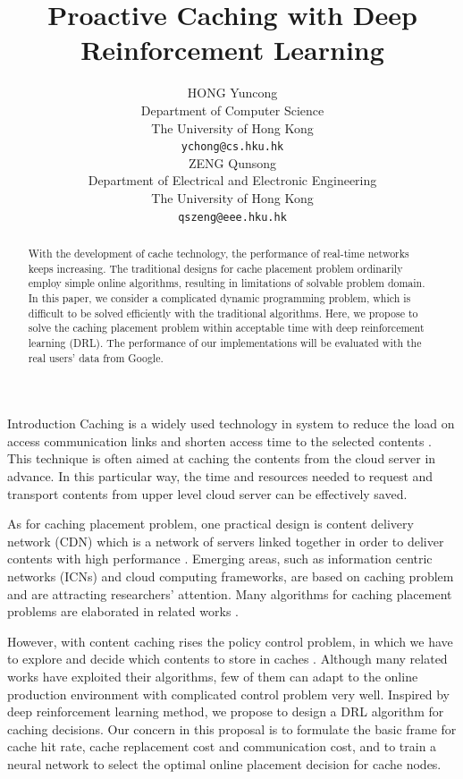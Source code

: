 \documentclass{article}
\title{Proactive Caching with Deep Reinforcement Learning}
\author{
  HONG Yuncong \\
  Department of Computer Science \\
  The University of Hong Kong \\
  \texttt{ychong@cs.hku.hk} \\
  \And %
  ZENG Qunsong \\
  Department of Electrical and Electronic Engineering \\
  The University of Hong Kong \\
  \texttt{qszeng@eee.hku.hk} \\
}
\begin{document}
\maketitle

\begin{abstract}
  With the development of cache technology, the performance of real-time networks keeps increasing. The traditional designs for cache placement problem ordinarily employ simple online algorithms, resulting in limitations of solvable problem domain. In this paper, we consider a complicated dynamic programming problem, which is difficult to be solved efficiently with the traditional algorithms. Here, we propose to solve the caching placement problem within acceptable time with deep reinforcement learning (DRL). The performance of our implementations will be evaluated with the real users' data from Google.
\end{abstract}

\begin{section}{Introduction}
    \label{sec:intro}
    Caching is a widely used technology in system to reduce the load on access communication links and shorten access time to the selected contents \cite{general-cache}. This technique is often aimed at caching the contents from the cloud server in advance. In this particular way, the time and resources needed to request and transport contents from upper level cloud server can be effectively saved.
    
    As for caching placement problem, one practical design is content delivery network (CDN) which is a network of servers linked together in order to deliver contents with high performance \cite{cloudflare}. Emerging areas, such as information centric networks (ICNs) and cloud computing frameworks, \cite{ref1,ref2,ref3,ref4} are based on caching problem and are attracting researchers' attention. Many algorithms for caching placement problems are elaborated in related works \cite{dl-mec,dl-icn,expert-cdn}.
    
    However, with content caching rises the policy control problem, in which we have to explore and decide which contents to store in caches \cite{DBLP:journals/corr/abs-1712-08132}. Although many related works have exploited their algorithms, few of them can adapt to the online production environment with complicated control problem very well. Inspired by deep reinforcement learning method, we propose to design a DRL algorithm for caching decisions. Our concern in this proposal is to formulate the basic frame for cache hit rate, cache replacement cost and communication cost, and to train a neural network to select the optimal online placement decision for cache nodes.
\end{section}
\end{document}
